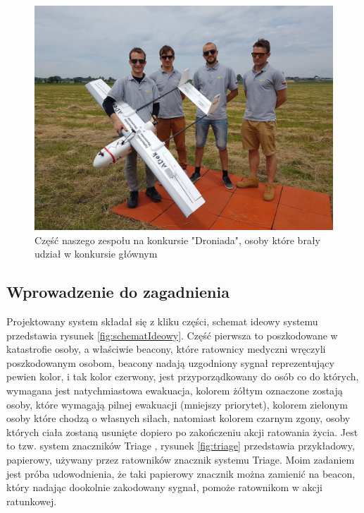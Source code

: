 \begin{figure}[!th]
    \centering
    \includegraphics[width=15cm]{zalaczniki/obrazy/droniada.jpg}
    \caption{Część naszego zespołu na konkursie "Droniada", osoby które brały udział w konkursie głównym}
    \label{fig:zespoldroniada}
\end{figure}

\subsection{Wprowadzenie do zagadnienia}

Projektowany system składał się z kliku części, schemat ideowy systemu przedstawia rysunek \ref{fig:schematIdeowy}. Część pierwsza to poszkodowane w katastrofie osoby, a właściwie beacony, które ratownicy medyczni wręczyli poszkodowanym osobom, beacony nadają uzgodniony sygnał reprezentujący pewien kolor, i tak kolor czerwony, jest przyporządkowany do osób co do których, wymagana jest natychmiastowa ewakuacja, kolorem żółtym oznaczone zostają osoby, które wymagają pilnej ewakuacji (mniejszy priorytet), kolorem zielonym osoby które chodzą o własnych siłach, natomiast kolorem czarnym zgony, osoby których ciała zostaną usunięte dopiero po zakończeniu akcji ratowania życia. Jest to tzw. system znaczników Triage \cite{triage}, rysunek \ref{fig:triage} przedstawia przykładowy, papierowy, używany przez ratowników znacznik systemu Triage. Moim zadaniem jest próba udowodnienia, że taki papierowy znacznik można zamienić na beacon, który nadając dookolnie zakodowany sygnał, pomoże ratownikom w akcji ratunkowej.

